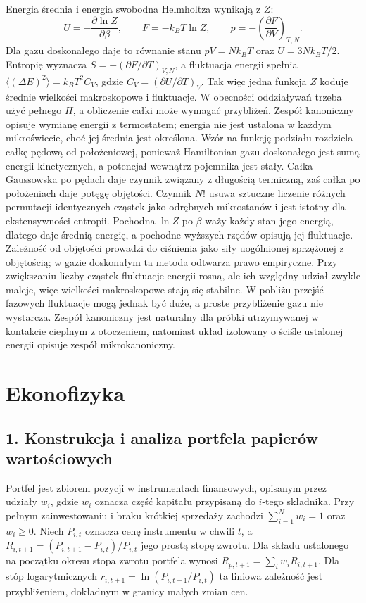 \documentclass[11pt,a4paper]{article}
\begin{document}
Energia średnia i energia swobodna Helmholtza wynikają z \(Z\):
\[
U=-\frac{\partial\ln Z}{\partial\beta},\qquad
F=-k_BT\ln Z,\qquad
p=-\left(\frac{\partial F}{\partial V}\right)_{T,N}.
\]
Dla gazu doskonałego daje to równanie stanu \(pV=Nk_BT\) oraz \(U=3Nk_BT/2\). Entropię wyznacza \(S=-\left(\partial F/\partial T\right)_{V,N}\), a fluktuacja energii spełnia \(\langle(\Delta E)^2\rangle=k_BT^2C_V\), gdzie \(C_V=(\partial U/\partial T)_V\). Tak więc jedna funkcja \(Z\) koduje średnie wielkości makroskopowe i fluktuacje. W obecności oddziaływań trzeba użyć pełnego \(H\), a obliczenie całki może wymagać przybliżeń. Zespół kanoniczny opisuje wymianę energii z termostatem; energia nie jest ustalona w każdym mikroświecie, choć jej średnia jest określona.
Wzór na funkcję podziału rozdziela całkę pędową od położeniowej, ponieważ Hamiltonian gazu doskonałego jest sumą energii kinetycznych, a potencjał wewnątrz pojemnika jest stały. Całka Gaussowska po pędach daje czynnik związany z długością termiczną, zaś całka po położeniach daje potęgę objętości. Czynnik \(N!\) usuwa sztuczne liczenie różnych permutacji identycznych cząstek jako odrębnych mikrostanów i jest istotny dla ekstensywności entropii. Pochodna \(\ln Z\) po \(\beta\) waży każdy stan jego energią, dlatego daje średnią energię, a pochodne wyższych rzędów opisują jej fluktuacje. Zależność od objętości prowadzi do ciśnienia jako siły uogólnionej sprzężonej z objętością; w gazie doskonałym ta metoda odtwarza prawo empiryczne. Przy zwiększaniu liczby cząstek fluktuacje energii rosną, ale ich względny udział zwykle maleje, więc wielkości makroskopowe stają się stabilne. W pobliżu przejść fazowych fluktuacje mogą jednak być duże, a proste przybliżenie gazu nie wystarcza. Zespół kanoniczny jest naturalny dla próbki utrzymywanej w kontakcie cieplnym z otoczeniem, natomiast układ izolowany o ściśle ustalonej energii opisuje zespół mikrokanoniczny.

\clearpage
\section{Ekonofizyka}
\subsection{1. Konstrukcja i analiza portfela papierów wartościowych}

Portfel jest zbiorem pozycji w instrumentach finansowych, opisanym przez udziały \(w_i\), gdzie \(w_i\) oznacza część kapitału przypisaną do \(i\)-tego składnika. Przy pełnym zainwestowaniu i braku krótkiej sprzedaży zachodzi \(\sum_{i=1}^{N}w_i=1\) oraz \(w_i\geq 0\). Niech \(P_{i,t}\) oznacza cenę instrumentu w chwili \(t\), a \(R_{i,t+1}=(P_{i,t+1}-P_{i,t})/P_{i,t}\) jego prostą stopę zwrotu. Dla składu ustalonego na początku okresu stopa zwrotu portfela wynosi \(R_{p,t+1}=\sum_i w_iR_{i,t+1}\). Dla stóp logarytmicznych \(r_{i,t+1}=\ln(P_{i,t+1}/P_{i,t})\) ta liniowa zależność jest przybliżeniem, dokładnym w granicy małych zmian cen.
\end{document}
